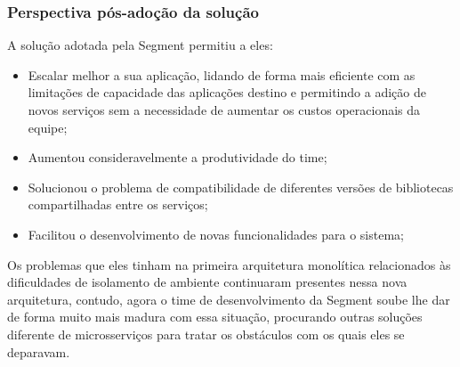 \subsubsection{Perspectiva pós-adoção da solução}

A solução adotada pela Segment permitiu a eles:

\begin{itemize}
    \item Escalar melhor a sua aplicação, lidando de forma mais eficiente com as limitações de
        capacidade das aplicações destino e permitindo a adição de novos serviços sem a necessidade
        de aumentar os custos operacionais da equipe;
    \item Aumentou consideravelmente a produtividade do time;
    \item Solucionou o problema de compatibilidade de diferentes versões de bibliotecas
        compartilhadas entre os serviços;
    \item Facilitou o desenvolvimento de novas funcionalidades para o sistema;
\end{itemize}

Os problemas que eles tinham na primeira arquitetura monolítica relacionados às dificuldades de
isolamento de ambiente continuaram presentes nessa nova arquitetura, contudo, agora o time de
desenvolvimento da Segment soube lhe dar de forma muito mais madura com essa situação, procurando
outras soluções diferente de microsserviços para tratar os obstáculos com os quais eles se
deparavam.

